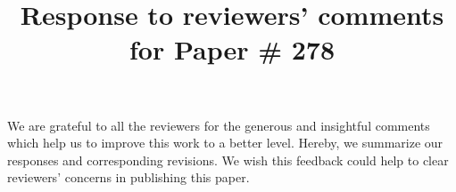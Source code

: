 \documentclass{vldb}
\begin{document}
\title{Response to reviewers' comments for Paper \# 278}
\maketitle

We are grateful to all the reviewers for the generous and insightful
comments which help us to improve this work to a better level. Hereby, 
we summarize our responses and corresponding revisions.
We wish this feedback could help to clear reviewers' concerns 
in publishing this paper.





\end{document}
